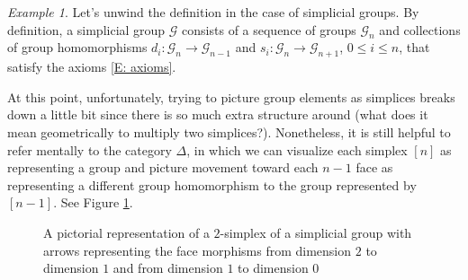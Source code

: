 \documentclass[12pt]{article}
\theoremstyle{plain}
\theoremstyle{definition}
\theoremstyle{remark}
\newtheorem{example}[theorem]{Example}
\newcommand{\mc}[1]{\mathcal{#1}}
\begin{document}
\begin{example}
Let's unwind the definition in the case of simplicial groups. By definition, a simplicial group $\mc G$ consists of a sequence of groups $\mc G_n$ and collections of group homomorphisms $d_i\colon\mc G_n\to \mc G_{n-1}$ and $s_i\colon\mc G_n\to\mc G_{n+1}$, $0\leq i\leq n$, that satisfy the axioms \eqref{E: axioms}.

At this point, unfortunately, trying to picture group elements as simplices breaks down a little bit since there is so much extra structure around (what does it mean geometrically to multiply two simplices?). Nonetheless, it is still helpful to refer mentally to the category $\Delta$, in which we can visualize each simplex $[n]$ as representing  a group and picture movement toward each $n-1$ face as representing a different group homomorphism to the group represented by $[n-1]$. See Figure \ref{F: fig17}.
\end{example}

\begin{figure}[!htp]
\begin{center}
\end{center}
\caption{A pictorial representation of a $2$-simplex of a simplicial group with arrows representing the face morphisms from dimension $2$ to dimension $1$ and from dimension $1$ to dimension $0$}\label{F: fig17}
\end{figure}
\end{document}
